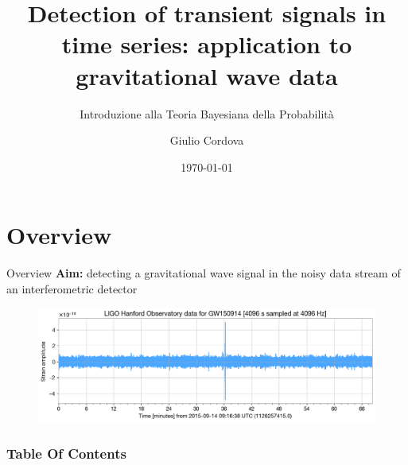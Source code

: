 \documentclass[
10pt,
aspectratio=169,
]{beamer}
\title{Detection of transient signals in time series: application to gravitational wave data}
\subtitle{Introduzione alla Teoria Bayesiana della Probabilità}
\author[G.C.]{Giulio Cordova}
\institute[Università di Pisa]{Dipartimento di Fisica E. Fermi\\
Università di Pisa}
\date{\today}
\newcommand\boldblue[1]{\textcolor{Veronagrayblue}{\textbf{#1}}}
\begin{document}
\maketitle









\section*{Overview}
\begin{frame}{Overview}
\boldblue{Aim:} detecting a gravitational wave signal in the noisy data stream of an interferometric detector
    \begin{figure}
        \centering
        \includegraphics[width=\linewidth]{h1_strain_data.png}
    \end{figure}
\end{frame}
\begin{frame}%
		\frametitle{Table Of Contents}%
		\textbf{\tableofcontents} %
	\end{frame}%
\end{document}
